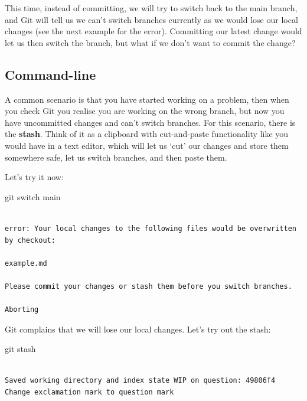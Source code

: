 \documentclass[
  letterpaper,
  DIV=11,
  numbers=noendperiod]{scrartcl}
\newenvironment{Shaded}{\begin{snugshade}}{\end{snugshade}}
\newcommand{\ControlFlowTok}[1]{\textcolor[rgb]{0.00,0.23,0.31}{#1}}
\newcommand{\NormalTok}[1]{\textcolor[rgb]{0.00,0.23,0.31}{#1}}
\begin{document}
This time, instead of committing, we will try to switch back to the main
branch, and Git will tell us we can't switch branches currently as we
would lose our local changes (see the next example for the error).
Committing our latest change would let us then switch the branch, but
what if we don't want to commit the change?

\subsection{Command-line}

A common scenario is that you have started working on a problem, then
when you check Git you realise you are working on the wrong branch, but
now you have uncommitted changes and can't switch branches. For this
scenario, there is the \textbf{stash}. Think of it as a clipboard with
cut-and-paste functionality like you would have in a text editor, which
will let us `cut' our changes and store them somewhere safe, let us
switch branches, and then paste them.

Let's try it now:

\begin{Shaded}
\begin{Highlighting}[]
\NormalTok{git }\ControlFlowTok{switch}\NormalTok{ main}
\end{Highlighting}
\end{Shaded}

\begin{verbatim}

error: Your local changes to the following files would be overwritten by checkout:

example.md

Please commit your changes or stash them before you switch branches.

Aborting
\end{verbatim}

Git complains that we will lose our local changes. Let's try out the
stash:

\begin{Shaded}
\begin{Highlighting}[]
\NormalTok{git stash}
\end{Highlighting}
\end{Shaded}

\begin{verbatim}

Saved working directory and index state WIP on question: 49806f4 Change exclamation mark to question mark
\end{verbatim}
\end{document}
